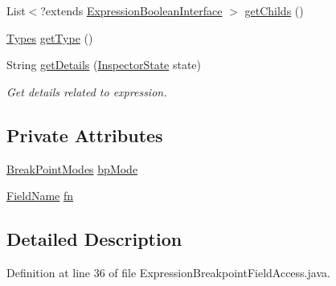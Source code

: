 \begin{DoxyCompactItemize}
List$<$?extends \hyperlink{interfacegov_1_1nasa_1_1jpf_1_1inspector_1_1server_1_1expression_1_1_expression_boolean_interface}{Expression\+Boolean\+Interface} $>$ \hyperlink{classgov_1_1nasa_1_1jpf_1_1inspector_1_1server_1_1expression_1_1_expression_boolean_leaf_aa99bf3cf13bd8cc1d6c33208bc83b185}{get\+Childs} ()
\item 
\hyperlink{enumgov_1_1nasa_1_1jpf_1_1inspector_1_1server_1_1expression_1_1_types}{Types} \hyperlink{classgov_1_1nasa_1_1jpf_1_1inspector_1_1server_1_1expression_1_1_expression_boolean_aed010ff8683eb1e8621e226703133457}{get\+Type} ()
\item 
String \hyperlink{classgov_1_1nasa_1_1jpf_1_1inspector_1_1server_1_1expression_1_1_expression_boolean_a43423e204404f24bf7862de938598eb7}{get\+Details} (\hyperlink{interfacegov_1_1nasa_1_1jpf_1_1inspector_1_1server_1_1expression_1_1_inspector_state}{Inspector\+State} state)
\begin{DoxyCompactList}\small\item\em Get details related to expression. \end{DoxyCompactList}\end{DoxyCompactItemize}
\subsection*{Private Attributes}
\begin{DoxyCompactItemize}
\item 
\hyperlink{enumgov_1_1nasa_1_1jpf_1_1inspector_1_1server_1_1breakpoints_1_1_break_point_modes}{Break\+Point\+Modes} \hyperlink{classgov_1_1nasa_1_1jpf_1_1inspector_1_1server_1_1expression_1_1expressions_1_1_expression_breakpoint_field_access_ae29473bbd43178e6a1987be832d55484}{bp\+Mode}
\item 
\hyperlink{classgov_1_1nasa_1_1jpf_1_1inspector_1_1utils_1_1expressions_1_1_field_name}{Field\+Name} \hyperlink{classgov_1_1nasa_1_1jpf_1_1inspector_1_1server_1_1expression_1_1expressions_1_1_expression_breakpoint_field_access_a09333f12f013e19c50cc328e448990fc}{fn}
\end{DoxyCompactItemize}


\subsection{Detailed Description}


Definition at line 36 of file Expression\+Breakpoint\+Field\+Access.\+java.



